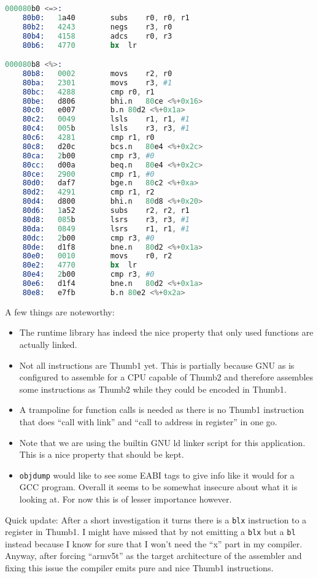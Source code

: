 \documentclass[12pt, article]{article}
\begin{document}
\begin{lstlisting}[language=Assembler, basicstyle=\footnotesize]
000080b0 <=>:
    80b0:	1a40      	subs	r0, r0, r1
    80b2:	4243      	negs	r3, r0
    80b4:	4158      	adcs	r0, r3
    80b6:	4770      	bx	lr

000080b8 <%>:
    80b8:	0002      	movs	r2, r0
    80ba:	2301      	movs	r3, #1
    80bc:	4288      	cmp	r0, r1
    80be:	d806      	bhi.n	80ce <%+0x16>
    80c0:	e007      	b.n	80d2 <%+0x1a>
    80c2:	0049      	lsls	r1, r1, #1
    80c4:	005b      	lsls	r3, r3, #1
    80c6:	4281      	cmp	r1, r0
    80c8:	d20c      	bcs.n	80e4 <%+0x2c>
    80ca:	2b00      	cmp	r3, #0
    80cc:	d00a      	beq.n	80e4 <%+0x2c>
    80ce:	2900      	cmp	r1, #0
    80d0:	daf7      	bge.n	80c2 <%+0xa>
    80d2:	4291      	cmp	r1, r2
    80d4:	d800      	bhi.n	80d8 <%+0x20>
    80d6:	1a52      	subs	r2, r2, r1
    80d8:	085b      	lsrs	r3, r3, #1
    80da:	0849      	lsrs	r1, r1, #1
    80dc:	2b00      	cmp	r3, #0
    80de:	d1f8      	bne.n	80d2 <%+0x1a>
    80e0:	0010      	movs	r0, r2
    80e2:	4770      	bx	lr
    80e4:	2b00      	cmp	r3, #0
    80e6:	d1f4      	bne.n	80d2 <%+0x1a>
    80e8:	e7fb      	b.n	80e2 <%+0x2a>
\end{lstlisting}

A few things are noteworthy:
\begin{itemize}
\item The runtime library has indeed the nice property that only used
  functions are actually linked.
\item Not all instructions are Thumb1 yet. This is partially because
  GNU as is configured to assemble for a CPU capable of Thumb2 and
  therefore assembles some instructions as Thumb2 while they could be
  encoded in Thumb1.
\item A trampoline for function calls is needed as there is no Thumb1
  instruction that does ``call with link'' and ``call to address in
  register'' in one go.
\item Note that we are using the builtin GNU ld linker script for this
  application.
  This is a nice property that should be kept.
\item \texttt{objdump} would like to see some EABI tags to give info
  like it would for a GCC program.
  Overall it seems to be somewhat insecure about what it is looking
  at.
  For now this is of lesser importance however.
\end{itemize}

\hline

Quick update: After a short investigation it turns there is a
\texttt{blx} instruction to a register in Thumb1.
I might have missed that by not emitting a \texttt{blx} but a
\texttt{bl} instead because I know for sure that I won't need the
``x'' part in my compiler.
Anyway, after forcing ``armv5t'' as the target architecture of the
assembler and fixing this issue the compiler emits pure and nice
Thumb1 instructions.
\end{document}
